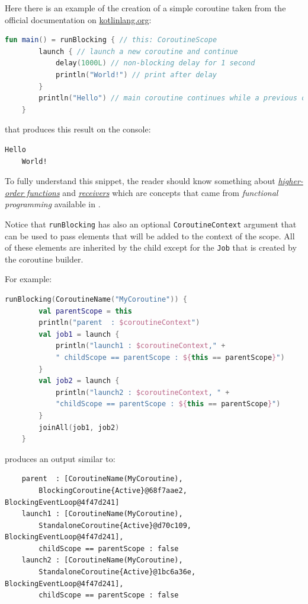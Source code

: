 Here there is an example of the creation of a simple coroutine taken from the official documentation on \href{https://kotlinlang.org/docs/coroutines-basics.html#your-first-coroutine}{kotlinlang.org}:
\begin{lstlisting}[language=kotlin]
	fun main() = runBlocking { // this: CoroutineScope
		launch { // launch a new coroutine and continue
			delay(1000L) // non-blocking delay for 1 second
			println("World!") // print after delay
		}
		println("Hello") // main coroutine continues while a previous one is delayed
	}
\end{lstlisting}

that produces this result on the console:
\begin{lstlisting}[numbers=none]
	Hello
	World!
\end{lstlisting}

To fully understand this snippet, the reader should know something about \href{https://kotlinlang.org/docs/lambdas.html#higher-order-functions}{\textit{higher-order functions}} and \href{https://kotlinlang.org/docs/lambdas.html#function-types}{\textit{receivers}} which are concepts that came from \textit{functional programming} available in \Kotlin.

Notice that \texttt{runBlocking} has also an optional \texttt{CoroutineContext} argument that can be used to pass elements that will be added to the context of the scope. All of these elements are inherited by the child except for the \texttt{Job} that is created by the coroutine builder.

For example:
\begin{lstlisting}[language=Kotlin]
	runBlocking(CoroutineName("MyCoroutine")) {
		val parentScope = this
		println("parent  : $coroutineContext")
		val job1 = launch {
			println("launch1 : $coroutineContext," +
			" childScope == parentScope : ${this == parentScope}")
		}
		val job2 = launch {
			println("launch2 : $coroutineContext, " +
			"childScope == parentScope : ${this == parentScope}")
		}
		joinAll(job1, job2)
	}
\end{lstlisting}
produces an output similar to:
\begin{Verbatim}
	parent  : [CoroutineName(MyCoroutine),
		BlockingCoroutine{Active}@68f7aae2, BlockingEventLoop@4f47d241]
	launch1 : [CoroutineName(MyCoroutine),
		StandaloneCoroutine{Active}@d70c109, BlockingEventLoop@4f47d241],
		childScope == parentScope : false
	launch2 : [CoroutineName(MyCoroutine),
		StandaloneCoroutine{Active}@1bc6a36e, BlockingEventLoop@4f47d241],
		childScope == parentScope : false
\end{Verbatim}

